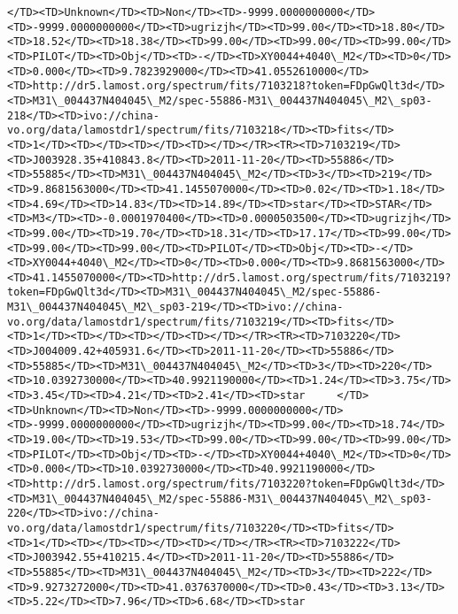 \documentclass[11pt]{article}
\begin{document}
\begin{Verbatim}[commandchars=\\\{\}]
</TD><TD>Unknown</TD><TD>Non</TD><TD>-9999.0000000000</TD><TD>-9999.0000000000</TD><TD>ugrizjh</TD><TD>99.00</TD><TD>18.80</TD><TD>18.52</TD><TD>18.38</TD><TD>99.00</TD><TD>99.00</TD><TD>99.00</TD><TD>PILOT</TD><TD>Obj</TD><TD>-</TD><TD>XY0044+4040\_M2</TD><TD>0</TD><TD>0.000</TD><TD>9.7823929000</TD><TD>41.0552610000</TD><TD>http://dr5.lamost.org/spectrum/fits/7103218?token=FDpGwQlt3d</TD><TD>M31\_004437N404045\_M2/spec-55886-M31\_004437N404045\_M2\_sp03-218</TD><TD>ivo://china-vo.org/data/lamostdr1/spectrum/fits/7103218</TD><TD>fits</TD><TD>1</TD><TD></TD><TD></TD><TD></TD></TR><TR><TD>7103219</TD><TD>J003928.35+410843.8</TD><TD>2011-11-20</TD><TD>55886</TD><TD>55885</TD><TD>M31\_004437N404045\_M2</TD><TD>3</TD><TD>219</TD><TD>9.8681563000</TD><TD>41.1455070000</TD><TD>0.02</TD><TD>1.18</TD><TD>4.69</TD><TD>14.83</TD><TD>14.89</TD><TD>star</TD><TD>STAR</TD><TD>M3</TD><TD>-0.0001970400</TD><TD>0.0000503500</TD><TD>ugrizjh</TD><TD>99.00</TD><TD>19.70</TD><TD>18.31</TD><TD>17.17</TD><TD>99.00</TD><TD>99.00</TD><TD>99.00</TD><TD>PILOT</TD><TD>Obj</TD><TD>-</TD><TD>XY0044+4040\_M2</TD><TD>0</TD><TD>0.000</TD><TD>9.8681563000</TD><TD>41.1455070000</TD><TD>http://dr5.lamost.org/spectrum/fits/7103219?token=FDpGwQlt3d</TD><TD>M31\_004437N404045\_M2/spec-55886-M31\_004437N404045\_M2\_sp03-219</TD><TD>ivo://china-vo.org/data/lamostdr1/spectrum/fits/7103219</TD><TD>fits</TD><TD>1</TD><TD></TD><TD></TD><TD></TD></TR><TR><TD>7103220</TD><TD>J004009.42+405931.6</TD><TD>2011-11-20</TD><TD>55886</TD><TD>55885</TD><TD>M31\_004437N404045\_M2</TD><TD>3</TD><TD>220</TD><TD>10.0392730000</TD><TD>40.9921190000</TD><TD>1.24</TD><TD>3.75</TD><TD>3.45</TD><TD>4.21</TD><TD>2.41</TD><TD>star     </TD><TD>Unknown</TD><TD>Non</TD><TD>-9999.0000000000</TD><TD>-9999.0000000000</TD><TD>ugrizjh</TD><TD>99.00</TD><TD>18.74</TD><TD>19.00</TD><TD>19.53</TD><TD>99.00</TD><TD>99.00</TD><TD>99.00</TD><TD>PILOT</TD><TD>Obj</TD><TD>-</TD><TD>XY0044+4040\_M2</TD><TD>0</TD><TD>0.000</TD><TD>10.0392730000</TD><TD>40.9921190000</TD><TD>http://dr5.lamost.org/spectrum/fits/7103220?token=FDpGwQlt3d</TD><TD>M31\_004437N404045\_M2/spec-55886-M31\_004437N404045\_M2\_sp03-220</TD><TD>ivo://china-vo.org/data/lamostdr1/spectrum/fits/7103220</TD><TD>fits</TD><TD>1</TD><TD></TD><TD></TD><TD></TD></TR><TR><TD>7103222</TD><TD>J003942.55+410215.4</TD><TD>2011-11-20</TD><TD>55886</TD><TD>55885</TD><TD>M31\_004437N404045\_M2</TD><TD>3</TD><TD>222</TD><TD>9.9273272000</TD><TD>41.0376370000</TD><TD>0.43</TD><TD>3.13</TD><TD>5.22</TD><TD>7.96</TD><TD>6.68</TD><TD>star     
\end{Verbatim}
\end{document}
